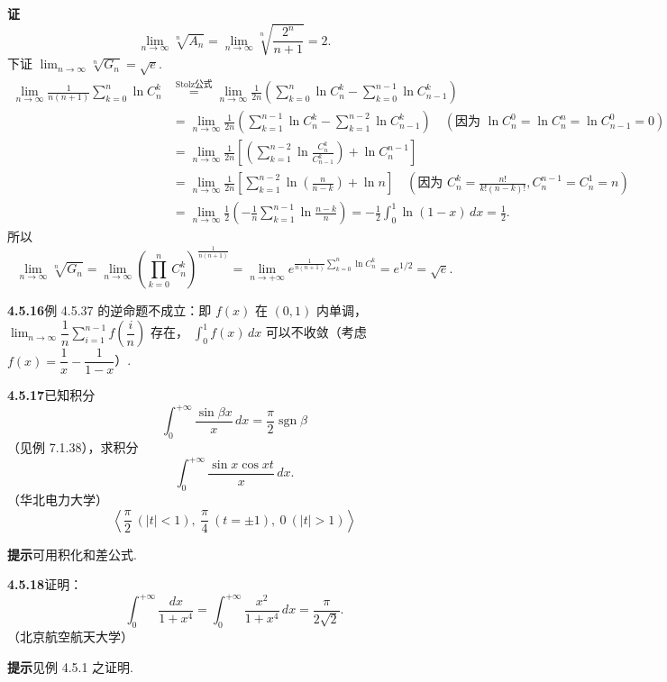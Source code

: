\documentclass[UTF8, 12pt, fontset=fandol, oneside]{ctexart}
\begin{document}
\noindent\textbf{证}\quad
\[
\lim_{n\to\infty}\sqrt[n]{A_n}
=\lim_{n\to\infty}\sqrt[n]{\frac{2^n}{n+1}}=2.
\]
下证 $\displaystyle\lim_{n\to\infty}\sqrt[n]{G_n}=\sqrt e$.
\[
\begin{aligned}
\lim_{n\to\infty}\frac1{n(n+1)}\sum_{k=0}^n\ln C_n^k
&\stackrel{\text{Stolz公式}}{=}
\lim_{n\to\infty}\frac1{2n}\left(\sum_{k=0}^n\ln C_n^k-\sum_{k=0}^{n-1}\ln C_{n-1}^k\right)\\
&=\lim_{n\to\infty}\frac1{2n}\left(\sum_{k=1}^{n-1}\ln C_n^k-\sum_{k=1}^{n-2}\ln C_{n-1}^k\right)
\quad(\text{因为 }\ln C_n^0=\ln C_n^n=\ln C_{n-1}^0=0)\\
&=\lim_{n\to\infty}\frac1{2n}\left[\left(\sum_{k=1}^{n-2}\ln\frac{C_n^k}{C_{n-1}^k}\right)+\ln C_n^{n-1}\right]\\
&=\lim_{n\to\infty}\frac1{2n}\left[\sum_{k=1}^{n-2}\ln\left(\frac n{n-k}\right)+\ln n\right]
\quad\left(\text{因为 }C_n^k=\frac{n!}{k!(n-k)!}, C_n^{n-1}=C_n^1=n\right)\\
&=\lim_{n\to\infty}\frac12\left(-\frac1n\sum_{k=1}^{n-1}\ln\frac{n-k}n\right)
=-\frac12\int_0^1\ln(1-x)\,dx=\frac12.
\end{aligned}
\]
所以
\[
\lim_{n\to\infty}\sqrt[n]{G_n}
=\lim_{n\to\infty}\left(\prod_{k=0}^n C_n^k\right)^{\frac1{n(n+1)}}
=\lim_{n\to+\infty}e^{\frac1{n(n+1)}\sum_{k=0}^n\ln C_n^k}
=e^{1/2}=\sqrt e.
\]

\noindent\textbf{4.5.16}\quad 例 4.5.37 的逆命题不成立：即 $f(x)$ 在 $(0,1)$ 内单调，
$\displaystyle\lim_{n\to\infty}\dfrac1n\sum_{i=1}^{n-1}f\left(\dfrac in\right)$ 存在，
$\displaystyle\int_0^1f(x)\,dx$ 可以不收敛（考虑 $f(x)=\dfrac1x-\dfrac1{1-x}$）.

\noindent\textbf{4.5.17}\quad 已知积分
\[
\int_0^{+\infty}\frac{\sin\beta x}{x}\,dx=\frac\pi2\operatorname{sgn}\beta
\]
（见例 7.1.38），求积分
\[
\int_0^{+\infty}\frac{\sin x\cos xt}{x}\,dx.
\]
（华北电力大学）
\[
\left\langle \frac\pi2\ (|t|<1),\ \frac\pi4\ (t=\pm1),\ 0\ (|t|>1)\right\rangle
\]

\noindent\textbf{提示}\quad 可用积化和差公式.

\noindent\textbf{4.5.18}\quad 证明：
\[
\int_0^{+\infty}\frac{dx}{1+x^4}
=\int_0^{+\infty}\frac{x^2}{1+x^4}\,dx
=\frac\pi{2\sqrt2}.
\]
（北京航空航天大学）

\noindent\textbf{提示}\quad 见例 4.5.1 之证明.
\end{document}
